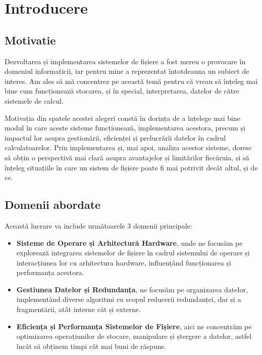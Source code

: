 \chapter{Introducere}

\section{Motivatie}


Dezvoltarea și implementarea sistemelor de fișiere a fost mereu o provocare în domeniul informaticii, iar pentru mine a reprezentat întotdeauna un subiect de interes. Am ales să mă concentrez pe această temă pentru că vreau să înțeleg mai bine cum funcționează stocarea, și în special, interpretarea, datelor de către sistemele de calcul.

Motivația din spatele acestei alegeri constă în dorința de a înțelege mai bine modul în care aceste sisteme funcționează, implementarea acestora, precum și impactul lor asupra gestionării, eficienței și prelucrării datelor în cadrul calculatoarelor. Prin implementarea și, mai apoi, analiza acestor sisteme, doresc să obțin o perspectivă mai clară asupra avantajelor și limitărilor fiecăruia, și să înțeleg situațiile în care un sistem de fișiere poate fi mai potrivit decât altul, și de ce.


\section{Domenii abordate}

Această lucrare va include următoarele 3 domenii principale:

\begin{itemize}
  \item \textbf{ Sisteme de Operare și Arhitectură Hardware}, unde ne focusăm pe explorează integrarea sistemelor de fișiere în cadrul sistemului de operare și interacțiunea lor cu arhitectura hardware, influențând funcționarea și performanța acestora.
  
  \item \textbf{ Gestiunea Datelor și Redundanța}, ne focusăm pe organizarea datelor, implementând diverse algoritmi cu scopul reducerii redundanței, dar și a fragmentării, atât interne cât și externe.
  
  \item \textbf{  Eficiența și Performanța Sistemelor de Fișiere}, aici ne concentrăm pe optimizarea operațiunilor de stocare, manipulare și ștergere a datelor, astfel încât să obținem timpi cât mai buni de răspuns.
\end{itemize}






